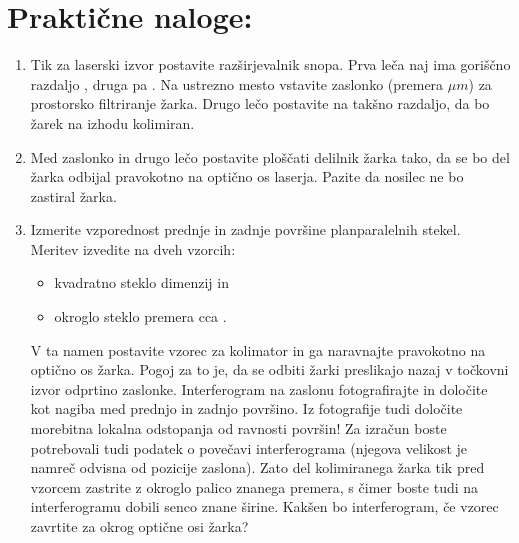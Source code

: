 \documentclass[letterpaper,10pt,english]{sphinxmanual}
\begin{document}
\section{Praktične naloge:}
\label{\detokenize{fizeau:prakticne-naloge}}\begin{enumerate}
%
\item {} 
\sphinxAtStartPar
Tik za laserski izvor postavite razširjevalnik snopa. Prva leča naj ima goriščno razdaljo , druga pa \sphinxstyleemphasis{150 mm}. Na ustrezno mesto vstavite zaslonko (premera  \({\mu}m\)) za prostorsko filtriranje žarka. Drugo lečo postavite na takšno razdaljo, da bo žarek na izhodu kolimiran.

\item {} 
\sphinxAtStartPar
Med zaslonko in drugo lečo postavite ploščati delilnik žarka tako, da se bo del žarka odbijal pravokotno na optično os laserja. Pazite da nosilec ne bo zastiral žarka.

\item {} 
\sphinxAtStartPar
Izmerite vzporednost prednje in zadnje površine planparalelnih stekel. Meritev izvedite na dveh vzorcih:
\begin{itemize}
\item {} 
\sphinxAtStartPar
kvadratno steklo dimenzij  in

\item {} 
\sphinxAtStartPar
okroglo steklo premera cca \sphinxstyleemphasis{40 mm}.

\end{itemize}

\sphinxAtStartPar
V ta namen postavite vzorec za kolimator in ga naravnajte pravokotno na optično os žarka. Pogoj za to je, da se odbiti žarki preslikajo nazaj v točkovni izvor \sphinxhyphen{} odprtino zaslonke. Interferogram na zaslonu fotografirajte in določite kot nagiba med prednjo in zadnjo površino. Iz fotografije tudi določite morebitna lokalna odstopanja od ravnosti površin! Za izračun boste potrebovali tudi podatek o povečavi interferograma (njegova velikost je namreč odvisna od pozicije zaslona). Zato del kolimiranega žarka tik pred vzorcem zastrite z okroglo palico znanega premera, s čimer boste tudi na interferogramu dobili senco znane širine. Kakšen bo interferogram, če vzorec zavrtite za  okrog optične osi žarka?


\end{enumerate}
\end{document}
